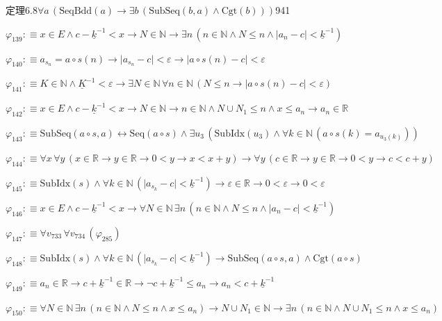 \begin{fullproof}{定理6.8}{$\forall a\,(\mathrm{SeqBdd}(a) \to \exists b\,(\mathrm{SubSeq}(b,a) \land \mathrm{Cgt}(b)))$}{941}
\begin{abbrevlist}
\item $\varphi_{139} :\equiv x \in E \land c - \underline{k}^{-1} < x \to N \in \mathbb{N} \to \exists n\,(n \in \mathbb{N} \land N \leq n \land \lvert a_{n} - c \rvert < \underline{k}^{-1})$
\item $\varphi_{140} :\equiv a_{s_{n}} = a \circ s(n) \to \lvert a_{s_{n}} - c \rvert < \varepsilon \to \lvert a \circ s(n) - c \rvert < \varepsilon$
\item $\varphi_{141} :\equiv K \in \mathbb{N} \land \underline{K}^{-1} < \varepsilon \to \exists N \in \mathbb{N}\,\forall n \in \mathbb{N}\,(N \leq n \to \lvert a \circ s(n) - c \rvert < \varepsilon)$
\item $\varphi_{142} :\equiv x \in E \land c - \underline{k}^{-1} < x \to N \in \mathbb{N} \to n \in \mathbb{N} \land N \cup N_{1} \leq n \land x \leq a_{n} \to a_{n} \in \mathbb{R}$
\item $\varphi_{143} :\equiv \mathrm{SubSeq}(a \circ s,a) \leftrightarrow \mathrm{Seq}(a \circ s) \land \exists u_{3}\,(\mathrm{SubIdx}(u_{3}) \land \forall k \in \mathbb{N}\,(a \circ s(k) = a_{u_{3}(k)}))$
\item $\varphi_{144} :\equiv \forall x\,\forall y\,(x \in \mathbb{R} \to y \in \mathbb{R} \to 0 < y \to x < x + y) \to \forall y\,(c \in \mathbb{R} \to y \in \mathbb{R} \to 0 < y \to c < c + y)$
\item $\varphi_{145} :\equiv \mathrm{SubIdx}(s) \land \forall k \in \mathbb{N}\,(\lvert a_{s_{k}} - c \rvert < \underline{k}^{-1}) \to \varepsilon \in \mathbb{R} \to 0 < \varepsilon \to 0 < \varepsilon$
\item $\varphi_{146} :\equiv x \in E \land c - \underline{k}^{-1} < x \to \forall N \in \mathbb{N}\,\exists n\,(n \in \mathbb{N} \land N \leq n \land \lvert a_{n} - c \rvert < \underline{k}^{-1})$
\item $\varphi_{147} :\equiv \forall v_{733}\,\forall v_{734}\,(\varphi_{285})$
\item $\varphi_{148} :\equiv \mathrm{SubIdx}(s) \land \forall k \in \mathbb{N}\,(\lvert a_{s_{k}} - c \rvert < \underline{k}^{-1}) \to \mathrm{SubSeq}(a \circ s,a) \land \mathrm{Cgt}(a \circ s)$
\item $\varphi_{149} :\equiv a_{n} \in \mathbb{R} \to c + \underline{k}^{-1} \in \mathbb{R} \to \neg c + \underline{k}^{-1} \leq a_{n} \to a_{n} < c + \underline{k}^{-1}$
\item $\varphi_{150} :\equiv \forall N \in \mathbb{N}\,\exists n\,(n \in \mathbb{N} \land N \leq n \land x \leq a_{n}) \to N \cup N_{1} \in \mathbb{N} \to \exists n\,(n \in \mathbb{N} \land N \cup N_{1} \leq n \land x \leq a_{n})$

\end{abbrevlist}
\end{fullproof}
